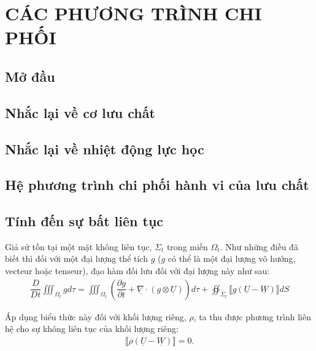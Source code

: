 \documentclass[../../main.tex]{subfiles}
\begin{document}
\chapter{CÁC PHƯƠNG TRÌNH CHI PHỐI}
	\section{Mở đầu}
		
	\section{Nhắc lại về cơ lưu chất}
		
	\section{Nhắc lại về nhiệt động lực học}
		
	\section{Hệ phương trình chi phối hành vi của lưu chất}
		
	\section{Tính đến sự bất liên tục}
Giả sử tồn tại một mặt không liên tục, $\Sigma_t$ trong miền $\Omega_t$. Như những điều đã biết thì đối với một đại lượng thể tích $g$ ($g$ có thể là một đại lượng vô hướng, vecteur hoặc tenseur), đạo hàm đối lưu đối với đại lượng này như sau:
\begin{align}
	\dfrac{D}{Dt}\iiint_{\Omega_t}gd\tau=\iiint_{\Omega_t}\left(\dfrac{\partial g}{\partial t}+\underline{\nabla}\cdot\left(g\otimes\underline{U}\right)\right)d\tau+\oiint_{\Sigma_t}\llbracket g\left(\underline{U}-\underline{W}\right)\rrbracket dS
\end{align}

Áp dụng biểu thức này đối với khối lượng riêng, $\rho$, ta thu được phương trình liên hệ cho sự không liên tục của khối lượng riêng:
\begin{align}
	\llbracket\rho\left(\underline U-\underline W\right)\rrbracket=0.
\end{align}
\end{document}
